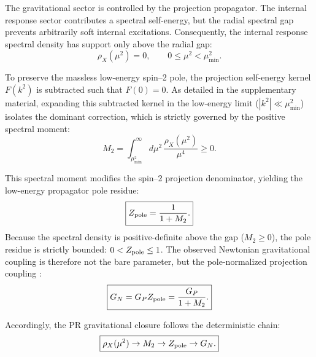 \documentclass[11pt]{article}
\begin{document}
The gravitational sector is controlled by the projection propagator. The internal response sector contributes a spectral self-energy, but the radial spectral gap prevents arbitrarily soft internal excitations. Consequently, the internal response spectral density has support only above the radial gap:
\begin{equation}
\boxed{
\rho_X(\mu^2)=0,
\qquad
0\le \mu^2<\mu_{\min}^2.
}
\end{equation}

To preserve the massless low-energy spin--2 pole, the projection self-energy kernel $F(k^2)$ is subtracted such that $F(0)=0$. As detailed in the supplementary material, expanding this subtracted kernel in the low-energy limit ($|k^2|\ll\mu_{\min}^2$) isolates the dominant correction, which is strictly governed by the positive spectral moment:
\begin{equation}
\boxed{
M_2
=
\int_{\mu_{\min}^2}^{\infty}
d\mu^2\,
\frac{\rho_X(\mu^2)}{\mu^4} \ge 0.
}
\end{equation}

This spectral moment modifies the spin--2 projection denominator, yielding the low-energy propagator pole residue:
\begin{equation}
\boxed{
Z_{\rm pole}
=
\frac{1}{1+M_2}.
}
\end{equation}
Because the spectral density is positive-definite above the gap ($M_2\ge0$), the pole residue is strictly bounded: $0<Z_{\rm pole}\le1$. The observed Newtonian \cite{newton1687} gravitational coupling is therefore not the bare parameter, but the pole-normalized projection coupling \cite{Donoghue1994}:
\begin{equation}
\boxed{
G_N
=
G_PZ_{\rm pole}
=
\frac{G_P}{1+M_2}.
}
\end{equation}

Accordingly, the PR gravitational closure follows the deterministic chain:
\begin{equation}
\boxed{
\rho_X(\mu^2)
\rightarrow
M_2
\rightarrow
Z_{\rm pole}
\rightarrow
G_N.
}
\end{equation}
\end{document}
